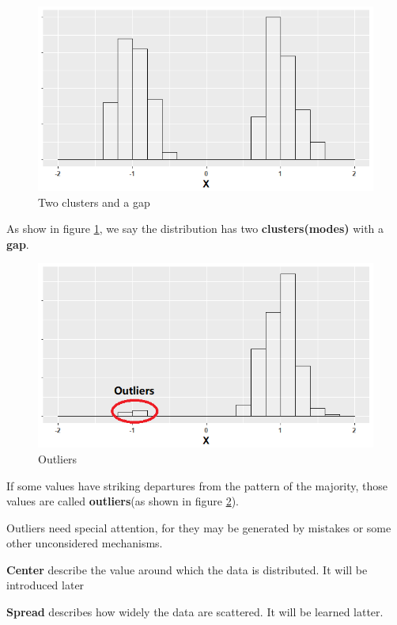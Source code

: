 \documentclass[a4paper, 12pt,twoside]{book}
\begin{document}
\begin{itemize}
\begin{figure}[H]
\centering
\includegraphics[scale=0.3]{TwoClusters.png}
\caption{Two clusters and a gap}
\label{TwoClusters}
\end{figure}
As show in figure \ref{TwoClusters}, we say the distribution has two \textbf{clusters(modes)} with a \textbf{gap}.

\begin{figure}[H]
\centering
\includegraphics[scale=0.3]{Outliers.png}
\caption{Outliers}
\label{Outliers}
\end{figure}

If some values have striking departures from the pattern of the majority, those values are called \textbf{outliers}(as shown in figure \ref{Outliers}).
 
\colorbox{babypink}{\parbox{14cm}{Outliers need special attention, for they may be generated by mistakes or some other unconsidered mechanisms.}}\vspace{0.6cm}

\textbf{Center} describe the value around which the data is distributed. It will be introduced later\vspace{0.6cm}

\textbf{Spread} describes how widely the data are scattered. It will be learned latter.
\end{itemize}
\newpage
\end{document}

